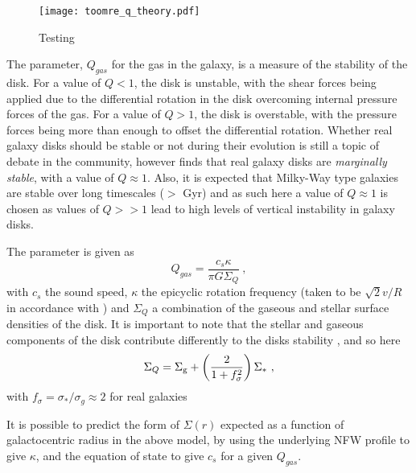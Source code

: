 \begin{figure}
    \centering
    \texttt{[image: toomre\_q\_theory.pdf]}
    \caption{Testing}
    \label{fig:toomreqthr}
\end{figure}

The \citet{toomre_on_1964} parameter, $Q_{gas}$ for the gas in the galaxy, is a measure of the stability of the disk.
For a value of $Q<1$, the disk is unstable, with the shear forces being applied due to the differential rotation in the disk overcoming internal pressure forces of the gas.
For a value of $Q>1$, the disk is overstable, with the pressure forces being more than enough to offset the differential rotation.
Whether real galaxy disks should be stable or not during their evolution is still a topic of debate in the community, however \citet{SOMEBODY} finds that real galaxy disks are \emph{marginally stable}, with a value of $Q \approx 1$.
Also, it is expected that Milky-Way type galaxies are stable over long timescales ($>$ Gyr) and as such here a value of $Q \approx 1$ is chosen as values of $Q >> 1$ lead to high levels of vertical instability in galaxy disks.

The \citet{toomre1964} parameter is given as
\begin{equation}
    Q_{gas} = \frac{c_s \kappa}{\pi G \Sigma_Q}~,
    \label{eqn:Q}
\end{equation}
with $c_s$ the sound speed, $\kappa$ the epicyclic rotation frequency (taken to be $\sqrt{2} v/R$ in accordance with \citet{livermore_resolved_2015}) and $\Sigma_Q$ a combination of the gaseous and stellar surface densities of the disk.
It is important to note that the stellar and gaseous components of the disk contribute differently to the disks stability \citep{rafikov_local_2001}, and so here
\begin{equation}
    \Sigma_Q = \Sigma_\mathrm{g}  + \left(\frac{2}{1 + f_\sigma^2}\right)\Sigma_*~,
    \label{eqn:sgq}
\end{equation}
with $f_\sigma = \sigma_*/\sigma_g \approx 2$ for real galaxies \citep{korchagin_local_2003}

It is possible to predict the form of $\Sigma(r)$ expected as a function of galactocentric radius in the above model, by using the underlying NFW profile to give $\kappa$, and the equation of state to give $c_s$ for a given $Q_{gas}$.





